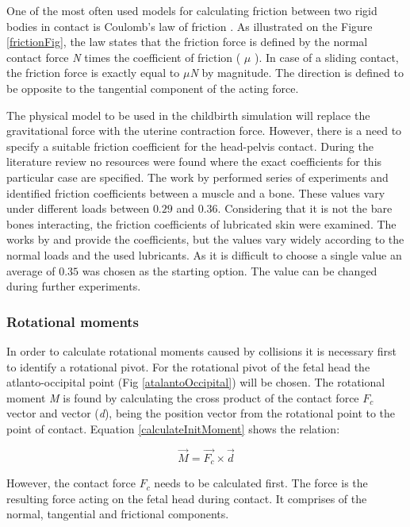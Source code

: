 One of the most often used models for calculating friction between two rigid bodies in contact is Coulomb's law of friction \citep{coulomb00}. As illustrated on the Figure \ref{frictionFig}, the law states that the friction force is defined by the normal contact force \emph{N} times the coefficient of friction ( $\mu$ ). In case of a sliding contact, the friction force is exactly equal to $\mu$\emph{N} by magnitude. The direction is defined to be opposite to the tangential component of the acting force.

The physical model to be used in the childbirth simulation will replace the gravitational force with the uterine contraction force. However, there is a need to specify a suitable friction coefficient for the head-pelvis contact. During the literature review no resources were found where the exact coefficients for this particular case are specified. The work by \citet{boneFrictionCoefficient} performed series of experiments and identified friction coefficients between a muscle and a bone. These values vary under different loads between $0.29$ and $0.36$. Considering that it is not the bare bones interacting, the friction coefficients of lubricated skin were examined. The works by \citet{skinFrictionInVivo} and \citet{realTimeSkinFriction} provide the coefficients, but the values vary widely according to the normal loads and the used lubricants. As it is difficult to choose a single value an average of $0.35$ was chosen as the starting option. The value can be changed during further experiments.


\subsubsection{Rotational moments}
In order to calculate rotational moments caused by collisions it is necessary first to identify a rotational pivot. For the rotational pivot of the fetal head the atlanto-occipital point (Fig \ref{atalantoOccipital}) will be chosen. The rotational moment \emph{M} is found by calculating the cross product of the contact force $F_c$ vector and vector (\emph{d}), being the position vector from the rotational point to the point of contact. Equation \ref{calculateInitMoment} shows the relation:

\begin{equation} \label{calculateInitMoment} \vec{M}=\vec{F_c}\times \vec{d} \end{equation}


However, the contact force $F_c$ needs to be calculated first. The force is the resulting force acting on the fetal head during contact. It comprises of the normal, tangential and frictional components.

